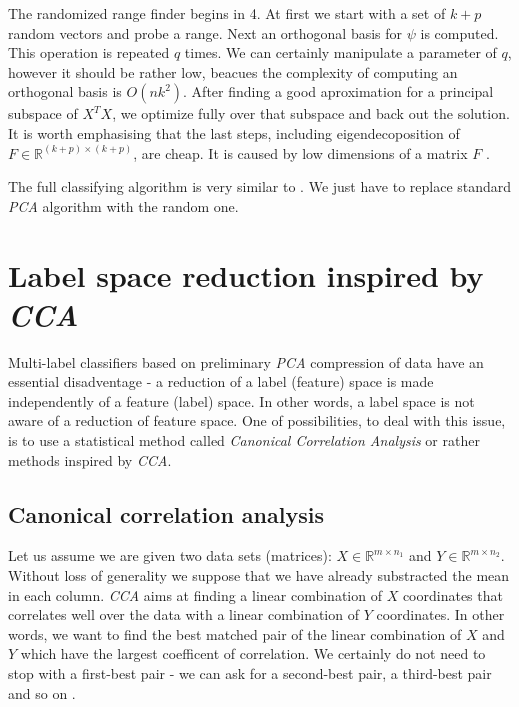 The randomized range finder begins in 4. At first we start with a set of $k+p$ random vectors and probe a range. Next an orthogonal basis for $\psi$ is computed. This operation is repeated $q$ times. We can certainly manipulate a parameter of $q$, however it should be rather low, beacues the complexity of computing an orthogonal basis is $O(nk^2)$. 
After finding a good aproximation for a principal subspace of $X^TX$, we optimize fully over that subspace and back out the solution. It is worth emphasising that the last steps, including eigendecoposition of $F \in \mathbb{R}^{(k+p) \times (k+p)}$, are cheap. It is caused by low dimensions of a matrix $F$ \cite{Mineiro}.

The full classifying algorithm is very similar to . We just have to replace standard \textit{PCA} algorithm with the random one.

\section{Label space reduction inspired by \textit{CCA}}

Multi-label classifiers based on preliminary \textit{PCA} compression of data have an essential disadventage - a reduction of a label (feature) space is made independently of a feature (label) space. In other words, a label space is not aware of a reduction of feature space. One of possibilities, to deal with this issue, is to use a statistical method called \textit{Canonical Correlation Analysis} or rather methods inspired by \textit{CCA}.   

\subsection{Canonical correlation analysis}

Let us assume we are given two data sets (matrices): $X \in \mathbb{R}^{m \times n_1}$ and $Y \in \mathbb{R}^{m \times n_2}$. Without loss of generality we suppose that we have already substracted the mean in each column. \textit{CCA} aims at finding a linear combination of $X$ coordinates that correlates well over the data with a linear combination of $Y$ coordinates. In other words, we want to find the best matched pair of the linear combination of $X$ and $Y$ which have the largest coefficent of correlation. We certainly do not need to stop with a first-best pair - we can ask for a second-best pair, a third-best pair and so on \cite{William}.


